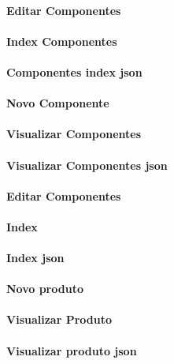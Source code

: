 \paragraph{Editar Componentes}

\paragraph{Index Componentes}

\paragraph{Componentes index json}

\paragraph{Novo Componente}

\paragraph{Visualizar Componentes}

\paragraph{Visualizar Componentes json}

\paragraph{Editar Componentes}

\paragraph{Index}

\paragraph{Index json}

\paragraph{Novo produto}

\paragraph{Visualizar Produto}

\paragraph{Visualizar produto json}



\newpage